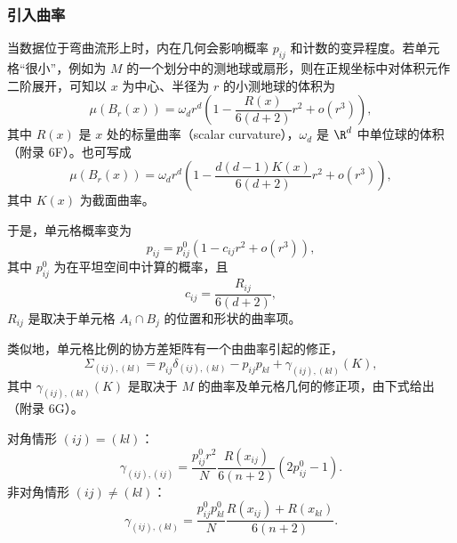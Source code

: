 \subsubsection{引入曲率}

当数据位于弯曲流形上时，内在几何会影响概率 $p_{ij}$ 和计数的变异程度。若单元格“很小”，例如为 $M$ 的一个划分中的测地球或扇形，则在正规坐标中对体积元作二阶展开，可知以 $x$ 为中心、半径为 $r$ 的小测地球的体积为
\begin{equation*}
  \mu(B_r(x))=\omega_d r^d\left(1-\frac{R(x)}{6(d+2)}r^2+o(r^3)\right),
  \tag{6.36a}\label{eq:6.36a}
\end{equation*}
其中 $R(x)$ 是 $x$ 处的标量曲率（scalar curvature），$\omega_d$ 是 $\R^d$ 中单位球的体积（附录 6F）。也可写成
\begin{equation*}
  \mu(B_r(x))=\omega_d r^d
    \left(1-\frac{d(d-1)K(x)}{6(d+2)}r^2+o(r^3)\right),
  \tag{6.36b}\label{eq:6.36b}
\end{equation*}
其中 $K(x)$ 为截面曲率。

于是，单元格概率变为
\begin{equation*}
  p_{ij}=p_{ij}^0\left(1-c_{ij}r^2+o(r^3)\right),
  \tag{6.37}\label{eq:6.37}
\end{equation*}
其中 $p_{ij}^0$ 为在平坦空间中计算的概率，且
\[
  c_{ij}=\frac{R_{ij}}{6(d+2)},
\]
$R_{ij}$ 是取决于单元格 $A_i\cap B_j$ 的位置和形状的曲率项。

类似地，单元格比例的协方差矩阵有一个由曲率引起的修正，
\begin{equation*}
  \Sigma_{(ij),(kl)}
   =p_{ij}\delta_{(ij),(kl)}-p_{ij}p_{kl}+\gamma_{(ij),(kl)}(K),
  \tag{6.38}\label{eq:6.38}
\end{equation*}
其中 $\gamma_{(ij),(kl)}(K)$ 是取决于 $M$ 的曲率及单元格几何的修正项，由下式给出（附录 6G）。

对角情形 $(ij)=(kl)$：
\begin{equation*}
  \gamma_{(ij),(ij)}
   =\frac{p_{ij}^0 r^2}{N}\frac{R(x_{ij})}{6(n+2)}(2p_{ij}^0-1).
  \tag{6.39a}\label{eq:6.39a}
\end{equation*}
非对角情形 $(ij)\ne(kl)$：
\begin{equation*}
  \gamma_{(ij),(kl)}
   =\frac{p_{ij}^0p_{kl}^0}{N}\frac{R(x_{ij})+R(x_{kl})}{6(n+2)}.
  \tag{6.39b}\label{eq:6.39b}
\end{equation*}

